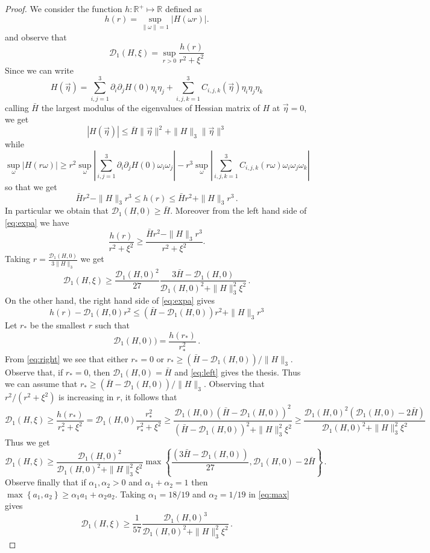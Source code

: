 \documentclass[10pt,a4paper]{amsart}
\newcommand\calD{{\mathcal D}}
\newcommand\set[1]{\left\{ #1 \right\}}
\renewcommand\v[1]{\vec{#1}}
\begin{document}
\begin{proof}
We consider the function $h:\mathds R^+\mapsto\mathds R$ defined as
\[
h(r)=\sup_{\|\omega\|=1}|H(\omega r)|.
\]
and observe that
\[
\calD_1(H,\xi)=\sup_{r>0}\frac{h(r)}{r^2+\xi^2}
\]
Since we can write
\[
H(\v\eta)=\sum_{i,j=1}^3\partial_i\partial_jH(0)\eta_i\eta_j+\sum_{i,j,k=1}^3C_{i,j,k}(\v\eta)\eta_i\eta_j\eta_k
\]
calling $\bar H$ the largest modulus of the eigenvalues of Hessian matrix of $H$ at $\v\eta=0$, we get
\[
|H(\v\eta)|\leq\bar H\|\v\eta\|^2+\|H\|_3\|\v\eta\|^3
\]
while 
\[
\sup_{\omega}|H(r\omega)|\geq r^2\sup_{\omega}\left|\sum_{i,j=1}^3\partial_i\partial_jH(0)\omega_i\omega_j\right|-
r^3\sup_{\omega}\left|\sum_{i,j,k=1}^3C_{i,j,k}(r\omega)\omega_i\omega_j\omega_k\right| 
\]
so that we get
\begin{equation}\label{eq:expa}
\bar H r^2 - \|H\|_3 r^3\leq h(r)\leq \bar H r^2+ \|H\|_3 r^3\, .
\end{equation}
In particular we obtain that $\calD_1(H,0)\geq \bar H$. Moreover from the left hand side of \eqref{eq:expa} we have
\[
\frac{h(r)}{r^2+\xi^2}\geq \frac{\bar H r^2-\|H\|_3r^3}{r^2+\xi^2}.
\]
Taking $r=\frac{\calD_1(H,0)}{3\|H\|_3}$ we get
\begin{equation}\label{eq:left}
\calD_1(H,\xi)\geq \frac{\calD_1(H,0)^2}{27}\frac{3\bar H -\calD_1(H,0)}{\calD_1(H,0)^2+\|H\|_3^2\xi^2}\, .
\end{equation}
On the other hand, the right hand side of \eqref{eq:expa} gives
\begin{equation}\label{eq:right}
h(r)-\calD_1(H,0)r^2\leq (\bar H-\calD_1(H,0)) r^2+ \|H\|_3 r^3
\end{equation}
Let $r_*$ be the smallest $r$ such that 
\[
\calD_1(H,0)) =\frac{h(r_*)}{r_*^2}\, .
\]
From \eqref{eq:right} we see that either $r_*=0$ or $r_*\geq (\bar H-\calD_1(H,0))/\|H\|_3$. Observe that, if $r_*=0$, then
$\calD_1(H,0)=\bar H$ and \eqref{eq:left} gives the thesis. Thus we can assume that $r_*\geq(\bar H-\calD_1(H,0))/\|H\|_3$.
Observing that $r^2/(r^2+\xi^2)$ is increasing in $r$, it follows that
\[
\calD_1(H,\xi)\geq \frac{h(r_*)}{r_*^2+\xi^2}= \calD_1(H,0)\frac{r_*^2}{r_*^2+\xi^2}\geq \frac{\calD_1(H,0)(\bar 
H-\calD_1(H,0))^2}{(\bar 
H-\calD_1(H,0))^2+\|H\|_3^2\xi^2}\geq \frac{\calD_1(H,0)^2(\calD_1(H,0)-2\bar H)}{\calD_1(H,0)^2+\|H\|_3^2\xi^2}
\]
Thus we get
\begin{equation}\label{eq:max}
\calD_1(H,\xi)\geq\frac{\calD_1(H,0)^2}{\calD_1(H,0)^2+\|H\|_3^2\xi^2}\max\set{\frac{(3\bar 
H-\calD_1(H,0))}{27},\calD_1(H,0)-2\bar H}\, .
\end{equation}
Observe finally that if $\alpha_1,\alpha_2>0$ and $\alpha_1+\alpha_2=1$ then $\max\set {a_1, a_2}\geq \alpha_1 
a_1+\alpha_2 a_2$. Taking $\alpha_1=18/19$ and $\alpha_2=1/19$ in \eqref{eq:max} gives
\[
\calD_1(H,\xi)\geq\frac 1{57}\frac{\calD_1(H,0)^3}{\calD_1(H,0)^2+\|H\|_3^2\xi^2}\, .
\]
\end{proof}
\end{document}
